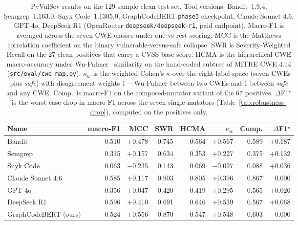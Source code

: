 \begin{table}[t]
\centering
\caption{PyVulSev results on the 129-sample clean test set.
Tool versions: Bandit~1.9.4, Semgrep~1.163.0, Snyk Code~1.1305.0,
GraphCodeBERT \texttt{phase3} checkpoint, Claude Sonnet 4.6, GPT-4o,
DeepSeek R1 (OpenRouter \texttt{deepseek/deepseek-r1}, paid endpoint). Macro-F1 is averaged across the seven
CWE classes under one-vs-rest scoring. MCC is the Matthews
correlation coefficient on the binary vulnerable-versus-safe
collapse. SWR is Severity-Weighted Recall on the 27 clean positives
that carry a CVSS base score. HCMA is the hierarchical CWE
macro-accuracy under Wu-Palmer~\cite{wupalmer1994} similarity on
the hand-coded subtree of MITRE CWE 4.14
(\texttt{src/eval/cwe\_map.py}). $\kappa_w$ is the weighted Cohen's
$\kappa$ over the eight-label space (seven CWEs plus \emph{safe})
with disagreement weights $1{-}$Wu-Palmer between two CWEs and $1$
between \emph{safe} and any CWE. Comp.\ is macro-F1 on the
composed-mutator variant of the 67 positives.
$\Delta$F1$^{\star}$ is the worst-case drop in macro-F1
across the seven single mutators (Table~\ref{tab:robustness-drop}),
computed on the positives only.}
\label{tab:pyvulsev-results}
\small
\setlength{\tabcolsep}{4.5pt}
\begin{tabular}{l r r r r r r r}
\hline
Name & macro-F1 & MCC & SWR & HCMA & $\kappa_w$ & Comp. & $\Delta$F1$^{\star}$ \\
\hline
Bandit               & 0.510 & +0.478 & 0.745 & 0.564 & +0.567 & 0.589 & +0.187 \\
Semgrep              & 0.315 & +0.157 & 0.634 & 0.353 & +0.227 & 0.375 & +0.132 \\
Snyk Code            & 0.063 & $-$0.235 & 0.143 & 0.069 & $-$0.097 & 0.088 & +0.036 \\
\hline
Claude Sonnet 4.6    & 0.585 & +0.117 & 0.903 & 0.805 & +0.396 & 0.867 & $0.000$ \\
GPT-4o               & 0.356 & +0.047 & 0.420 & 0.419 & +0.295 & 0.565 & +0.026 \\
DeepSeek R1          & 0.596 & +0.410 & 0.691 & 0.646 & +0.539 & 0.567 & +0.068 \\
\hline
GraphCodeBERT (ours) & 0.524 & +0.556 & 0.870 & 0.547 & +0.548 & 0.603 & $0.000$ \\
\hline
\end{tabular}
\end{table}

